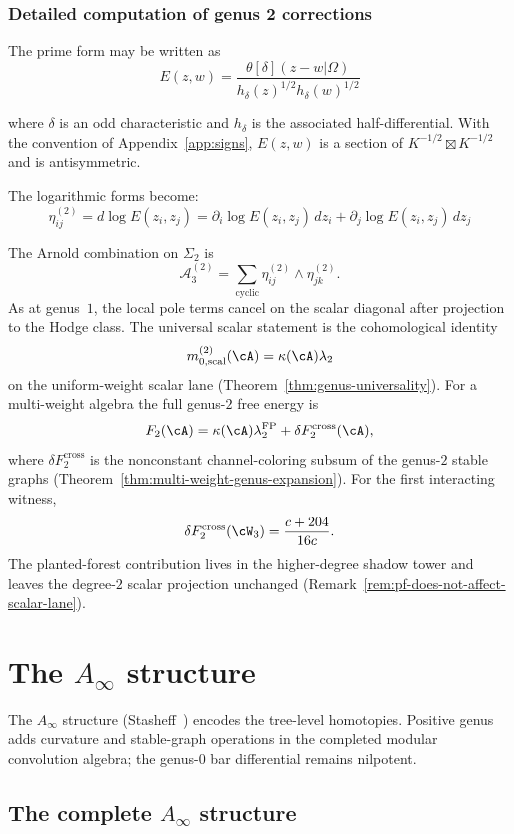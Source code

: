 \subsubsection{Detailed computation of genus 2 corrections}

The prime form may be written as
\[E(z,w) = \frac{\theta[\delta](z-w|\Omega)}{h_\delta(z)^{1/2} h_\delta(w)^{1/2}}\]

where $\delta$ is an odd characteristic and $h_\delta$ is the
associated half-differential.  With the convention of
Appendix~\ref{app:signs}, $E(z,w)$ is a section of
$K^{-1/2}\boxtimes K^{-1/2}$ and is antisymmetric.

The logarithmic forms become:
\[\eta_{ij}^{(2)} = d\log E(z_i, z_j) = \partial_i \log E(z_i, z_j)\, dz_i + \partial_j \log E(z_i, z_j)\, dz_j\]

The Arnold combination on $\Sigma_2$ is
\[\mathcal{A}_3^{(2)} = \sum_{\text{cyclic}} \eta_{ij}^{(2)} \wedge \eta_{jk}^{(2)}.\]
As at genus~$1$, the local pole terms cancel on the scalar diagonal
after projection to the Hodge class.  The universal scalar statement is
the cohomological identity
\[
m_{0,\mathrm{scal}}^{(2)}(\cA)
  = \kappa(\cA)\lambda_2
\]
on the uniform-weight scalar lane (Theorem~\ref{thm:genus-universality}).
For a multi-weight algebra the full genus-$2$ free energy is
\[
F_2(\cA)
=\kappa(\cA)\lambda_2^{\mathrm{FP}}
 +\delta F_2^{\mathrm{cross}}(\cA),
\]
where $\delta F_2^{\mathrm{cross}}$ is the nonconstant channel-coloring
subsum of the genus-$2$ stable graphs
(Theorem~\ref{thm:multi-weight-genus-expansion}).  For the first
interacting witness,
\[
\delta F_2^{\mathrm{cross}}(\cW_3)
=\frac{c+204}{16c}.
\]
The planted-forest contribution lives in the higher-degree shadow
tower and leaves the degree-$2$ scalar projection unchanged
(Remark~\ref{rem:pf-does-not-affect-scalar-lane}).

\section{\texorpdfstring{The $A_\infty$ structure}{The A-infinity structure}}

The $A_\infty$ structure (Stasheff~\cite{Sta63}) encodes the
tree-level homotopies.  Positive genus adds curvature and stable-graph
operations in the completed modular convolution algebra; the
genus-$0$ bar differential remains nilpotent.

\subsection{\texorpdfstring{The complete $A_\infty$ structure}{The complete A-infinity structure}}


